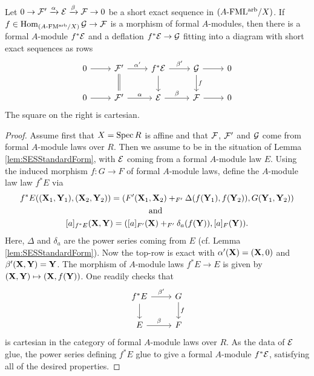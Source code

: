 \documentclass[../main.tex]{subfiles}
\begin{document}
\begin{lem}
  Let $0 \to \mathcal{F}' \xrightarrow{\alpha} \mathcal{E} \xrightarrow{\beta} \mathcal{F} \to 0$ be a short exact sequence in 
  ${({A}\text-\allowbreak\mathrm{FML^{arb}}/{X})}$. If $f \in \operatorname{Hom}_{{({A}\text-\allowbreak\mathrm{FM^{arb}}/{X})}} \mathcal{G} \to \mathcal{F}$ is a morphism 
  of formal $A$-modules, then there is a formal $A$-module $f^*\mathcal{E}$ 
  and a deflation $f^*\mathcal{E} \to \mathcal{G}$ fitting into a diagram with short exact 
  sequences as rows
  \begin{equation*}
    \begin{tikzcd}[ampersand replacement=\&]
	    0 \& {\cF'} \& {f^*\cE} \& \cG \& 0 \\
	    0 \& {\cF'} \& \cE \& \cF \& 0
	    \arrow[from=1-1, to=1-2]
	    \arrow["{\alpha'}", from=1-2, to=1-3]
	    \arrow[Rightarrow, no head, from=1-2, to=2-2]
	    \arrow["{\beta'}", from=1-3, to=1-4]
	    \arrow[from=1-3, to=2-3]
	    \arrow[from=1-4, to=1-5]
	    \arrow["f", from=1-4, to=2-4]
	    \arrow[from=2-1, to=2-2]
	    \arrow["\alpha", from=2-2, to=2-3]
	    \arrow["\beta", from=2-3, to=2-4]
	    \arrow[from=2-4, to=2-5]
    \end{tikzcd}
  \end{equation*}
  The square on the right is cartesian.
\begin{proof}
  Assume first that $X = \operatorname{Spec} R$ is affine and that $\mathcal{F}$, $\mathcal{F}'$ and $\mathcal{G}$ 
  come from formal $A$-module laws over $R$. Then we assume to be in the
  situation of Lemma \ref{lem:SESStandardForm}, with
  $\mathcal{E}$ coming from a formal $A$-module law $E$. Using the induced morphism 
  $f: G \to F$ of formal $A$-module laws, define the $A$-module law
  law $f^* E$ via
  \begin{gather*}
    f^*E((\mathbf{X}_1, \mathbf{Y}_1), (\mathbf{X}_2, \mathbf{Y}_2)) = (F'(\mathbf{X}_1, \mathbf{X}_2) +_{F'}
    \Delta(f(\mathbf{Y}_1), f(\mathbf{Y}_2)) , G(\mathbf{Y}_1, \mathbf{Y}_2)) \\
    \text{and } \\
    [a]_{f^*E}(\mathbf{X}, \mathbf{Y}) = ([a]_{F'}(\mathbf{X}) +_{F'} \delta_a(f(\mathbf{Y})), [a]_F(\mathbf{Y})).
  \end{gather*}
  Here, $\Delta$ and $\delta_a$ are the power series coming from $E$ (cf.
  Lemma \ref{lem:SESStandardForm}).
  Now the top-row is exact with $\alpha'(\mathbf{X}) = (\mathbf{X}, 0)$ and 
  $\beta'(\mathbf{X}, \mathbf{Y}) = \mathbf{Y}$. 
  The morphism of $A$-module laws $f^*E \to E$ is given by 
  $(\mathbf{X}, \mathbf{Y})\mapsto (\mathbf{X},f(\mathbf{Y}))$. One readily checks that 
  \begin{equation*}
    \begin{tikzcd}[ampersand replacement=\&]
    	{f^*E} \& G \\
    	E \& F
    	\arrow["{\beta'}", from=1-1, to=1-2]
    	\arrow[from=1-1, to=2-1]
    	\arrow["f", from=1-2, to=2-2]
    	\arrow["\beta", from=2-1, to=2-2]
    \end{tikzcd}
  \end{equation*}
  is cartesian in the category of formal $A$-module laws over $R$. 
  As the data of $\mathcal{E}$ glue, the power series defining $f^*E$ glue to give
  a formal $A$-module $f^*\mathcal{E}$, satisfying all of the desired properties.
\end{proof}
\end{lem}
\end{document}
